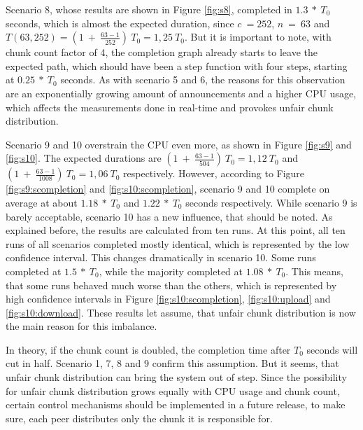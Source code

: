 Scenario 8, whose results are shown in Figure \ref{fig:s8}, completed in $1.3\:*\:T_0$ seconds, which is almost the expected duration, since $c\:=252$, $n\:=\:63$ and $T(63, 252) = (1\:+\:\frac{63-1}{252})\:T_0 = 1,25\:T_0$. But it is important to note, with chunk count factor of 4, the completion graph already starts to leave the expected path, which should have been a step function with four steps, starting at $0.25\:*\:T_0$ seconds. As with scenario 5 and 6, the reasons for this observation are an exponentially growing amount of announcements and a higher CPU usage, which affects the measurements done in real-time and provokes unfair chunk distribution.

Scenario 9 and 10 overstrain the CPU even more, as shown in Figure \ref{fig:s9} and \ref{fig:s10}. The expected durations are $(1\:+\:\frac{63-1}{504})\:T_0 = 1,12\:T_0$ and $(1\:+\:\frac{63-1}{1008})\:T_0 = 1,06\:T_0$ respectively. However, according to Figure \ref{fig:s9:scompletion} and \ref{fig:s10:scompletion}, scenario 9 and 10 complete on average at about $1.18\:*\:T_0$ and $1.22\:*\:T_0$ seconds respectively. While scenario 9 is barely acceptable, scenario 10 has a new influence, that should be noted. As explained before, the results are calculated from ten runs. At this point, all ten runs of all scenarios completed mostly identical, which is represented by the low confidence interval. This changes dramatically in scenario 10. Some runs completed at $1.5\:*\:T_0$, while the majority completed at $1.08\:*\:T_0$. This means, that some runs behaved much worse than the others, which is represented by high confidence intervals in Figure \ref{fig:s10:scompletion}, \ref{fig:s10:upload} and \ref{fig:s10:download}. These results let assume, that unfair chunk distribution is now the main reason for this imbalance.

In theory, if the chunk count is doubled, the completion time after $T_0$ seconds will cut in half. Scenario 1, 7, 8 and 9 confirm this assumption. But it seems, that unfair chunk distribution can bring the system out of step. Since
the possibility for unfair chunk distribution grows equally with CPU usage and chunk count, certain control mechanisms should be implemented in a future release, to make sure, each peer distributes only the chunk it is responsible for. 

\vfill



